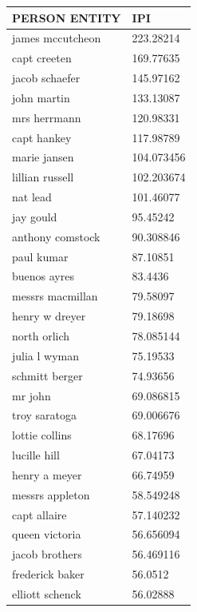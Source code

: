 \documentclass[letterpaper,11pt]{report}
\begin{document}
\begin{table}[h]
\centering
\begin{tabular}{|l|l|}
\hline
\textbf{PERSON ENTITY}      &  \textbf{  IPI}        \\ \hline
james mccutcheon   & 223.28214  \\ \hline
capt creeten       & 169.77635  \\ \hline
jacob schaefer     & 145.97162  \\ \hline
john martin        & 133.13087  \\ \hline
mrs herrmann       & 120.98331  \\ \hline
capt hankey        & 117.98789  \\ \hline
marie jansen       & 104.073456 \\ \hline
lillian russell    & 102.203674 \\ \hline
nat lead           & 101.46077  \\ \hline
jay gould          & 95.45242   \\ \hline
anthony comstock   & 90.308846  \\ \hline
paul kumar         & 87.10851   \\ \hline
buenos ayres       & 83.4436    \\ \hline
messrs macmillan   & 79.58097   \\ \hline
henry w dreyer     & 79.18698   \\ \hline
north orlich       & 78.085144  \\ \hline
julia l wyman      & 75.19533   \\ \hline
schmitt berger     & 74.93656   \\ \hline
mr john            & 69.086815  \\ \hline
troy saratoga      & 69.006676  \\ \hline
lottie collins     & 68.17696   \\ \hline
lucille hill       & 67.04173   \\ \hline
henry a meyer      & 66.74959   \\ \hline
messrs appleton    & 58.549248  \\ \hline
capt allaire       & 57.140232  \\ \hline
queen victoria     & 56.656094  \\ \hline
jacob brothers     & 56.469116  \\ \hline
frederick baker    & 56.0512    \\ \hline
elliott schenck    & 56.02888   \\ \hline

\end{tabular}
\end{table}
\end{document}
